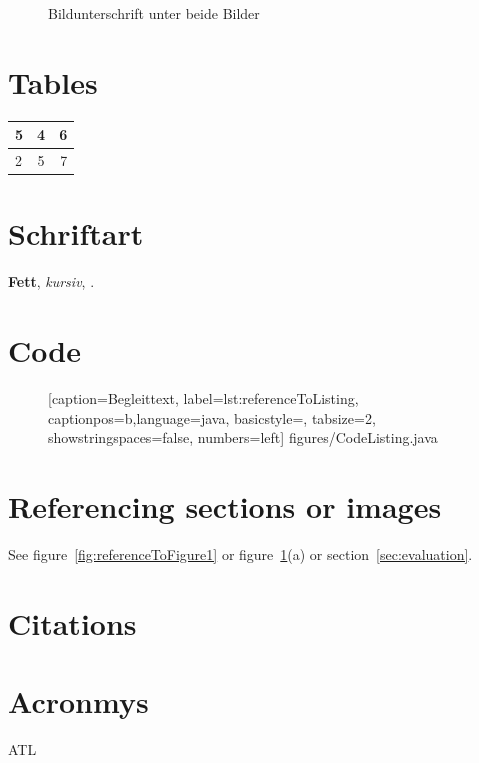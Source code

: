 		\begin{figure}[b!]
			\centering
			
			 \qquad
			\caption{Bildunterschrift unter beide Bilder}
			\label{fig:multipleFigures}
		\end{figure}
	
	\section{Tables}
		\begin{tabular}{lcr} %
			5 & 4 & 6 \\ %
			\midrule %
			2 & 5 & 7
		\end{tabular}
		
	\section{Schriftart}
		\textbf{Fett}, \emph{kursiv}, .
	
	\section{Code}
		\begin{figure}
			
			[caption={Begleittext},
			label={lst:referenceToListing},
			captionpos=b,language=java, basicstyle=\footnotesize, tabsize=2, showstringspaces=false,  numbers=left]
			{figures/CodeListing.java}
		\end{figure}
	
	\section{Referencing sections or images}
		See figure~\ref{fig:referenceToFigure1} or figure~\ref{fig:multipleFigures}(a) or section~\ref{sec:evaluation}.
		
	\section{Citations}
		\cite{mda}
		
	\section{Acronmys}
	\ac{ATL}